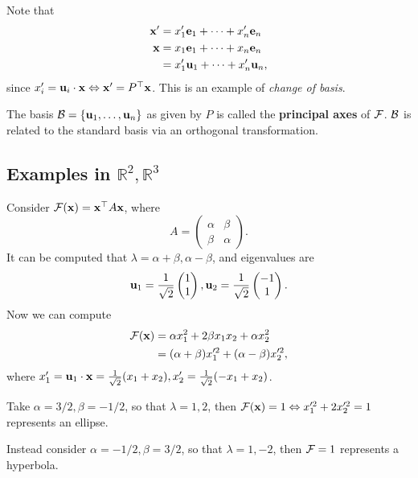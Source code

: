 \documentclass[10pt]{article}
\begin{document}
    Note that 
    \begin{align*}
        {\bf x}'&= x_1'{\bf e}_1+\cdots+x_n'{\bf e}_n\\
        {\bf x}&= x_1{\bf e}_1+ \cdots + x_n{\bf e}_n\\
        &= x_1'{\bf u}_1+\cdots +x_n'{\bf u}_n,
    \end{align*}
    since $x_i' = {\bf u}_i\cdot {\bf x} \Leftrightarrow {\bf x}'=P^{\top}{\bf x}$. This is an example of \textit{change of basis}.
    \begin{definition}
        The basis $ {\mathcal{B}} = \{{\bf u}_1,\dots,{\bf u}_n\} $ as given by $P$ is called the \textbf{principal axes} of ${\mathcal{F}}$. ${\mathcal{B}}$ is related to the standard basis via an orthogonal transformation.
    \end{definition}
    \subsection{Examples in $ \mathbb{R}^{2},\mathbb{R}^{3} $}
    \begin{example}[$ \mathbb{R}^{2} $]
        Consider $ {\mathcal{F}}({\bf x})={\bf x}^{\top}A{\bf x} $, where 
        \[
            A=\begin{pmatrix}
                \alpha&\beta\\
                \beta&\alpha
            \end{pmatrix}.
        \]
        It can be computed that $ \lambda = \alpha+\beta,\alpha-\beta $, and eigenvalues are
        \[
            {\bf u}_1 = \frac{1}{\sqrt{2}}\begin{pmatrix}
                1\\1
            \end{pmatrix}, {\bf u}_2 = \frac{1}{\sqrt{2}}\begin{pmatrix}
                -1\\1
            \end{pmatrix}.
        \]
        Now we can compute 
        \begin{align*}
            {\mathcal{F}}({\bf x})&= \alpha x_1^2+2\beta x_1x_2+\alpha x_2^2\\
            &= (\alpha+\beta)x_1'^2+(\alpha-\beta)x_2'^2,
        \end{align*}
        where $ x_1' = {\bf u}_1 \cdot {\bf x} = \frac{1}{\sqrt{2}}(x_1+x_2), x_2'= \frac{1}{\sqrt{2}}(-x_1+x_2)$.

        Take $ \alpha=3/2,\beta=-1/2 $, so that $ \lambda=1,2 $, then $ {\mathcal{F}}({\bf x})=1 \Leftrightarrow x_1'^2+2x_2'^2=1 $ represents an ellipse.

        Instead consider $ \alpha=-1/2, \beta=3/2 $, so that $ \lambda=1,-2 $, then $ {\mathcal{F}}=1 $ represents a hyperbola.
    \end{example}
\end{document}
